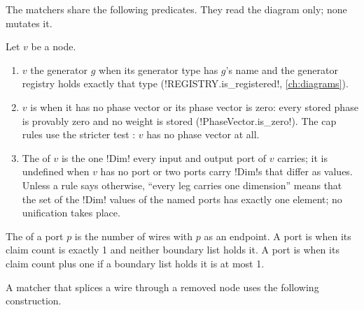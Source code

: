 The matchers share the following predicates. They read the diagram only; none mutates it.

\begin{definition}\label{def:rules-node-predicates}
Let $v$ be a node.
\begin{enumerate}
\item $v$  the generator $g$ when its generator type has $g$'s name and the generator registry holds exactly that type (\py!REGISTRY.is_registered!, \cref{ch:diagrams}).
\item $v$ is  when it has no phase vector or its phase vector is zero: every stored phase is provably zero and no weight is stored (\py!PhaseVector.is_zero!). The cap rules use the stricter test : $v$ has no phase vector at all.
\item The  of $v$ is the one \py!Dim! every input and output port of $v$ carries; it is undefined when $v$ has no port or two ports carry \py!Dim!s that differ as values. Unless a rule says otherwise, ``every leg carries one dimension'' means that the set of the \py!Dim! values of the named ports has exactly one element; no unification takes place.
\end{enumerate}
\end{definition}

\begin{definition}\label{def:rules-claims}
The  of a port $p$ is the number of wires with $p$ as an endpoint. A port is  when its claim count is exactly 1 and neither boundary list holds it. A port is  when its claim count plus one if a boundary list holds it is at most 1.
\end{definition}

A matcher that splices a wire through a removed node uses the following construction.

